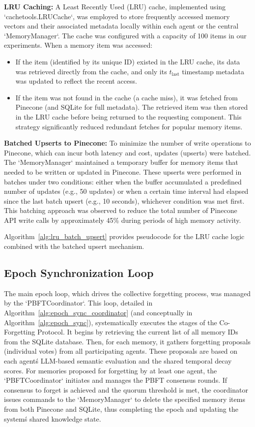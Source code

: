 \documentclass[conference]{IEEEtran}
\begin{document}
\textbf{LRU Caching:} A Least Recently Used (LRU) cache, implemented using `cachetools.LRUCache`, was employed to store frequently accessed memory vectors and their associated metadata locally within each agent or the central `MemoryManager`. The cache was configured with a capacity of 100 items in our experiments. When a memory item was accessed:
\begin{itemize}
    \item If the item (identified by its unique ID) existed in the LRU cache, its data was retrieved directly from the cache, and only its $t_{\text{last}}$ timestamp metadata was updated to reflect the recent access.
    \item If the item was not found in the cache (a cache miss), it was fetched from Pinecone (and SQLite for full metadata). The retrieved item was then stored in the LRU cache before being returned to the requesting component. This strategy significantly reduced redundant fetches for popular memory items.
\end{itemize}

\textbf{Batched Upserts to Pinecone:} To minimize the number of write operations to Pinecone, which can incur both latency and cost, updates (upserts) were batched. The `MemoryManager` maintained a temporary buffer for memory items that needed to be written or updated in Pinecone. These upserts were performed in batches under two conditions: either when the buffer accumulated a predefined number of updates (e.g., 50 updates) or when a certain time interval had elapsed since the last batch upsert (e.g., 10 seconds), whichever condition was met first. This batching approach was observed to reduce the total number of Pinecone API write calls by approximately 45\% during periods of high memory activity.

Algorithm~\ref{alg:lru_batch_upsert} provides pseudocode for the LRU cache logic combined with the batched upsert mechanism.

\subsection{Epoch Synchronization Loop}

The main epoch loop, which drives the collective forgetting process, was managed by the `PBFTCoordinator`. This loop, detailed in Algorithm~\ref{alg:epoch_sync_coordinator} (and conceptually in Algorithm~\ref{alg:epoch_sync}), systematically executes the stages of the Co-Forgetting Protocol. It begins by retrieving the current list of all memory IDs from the SQLite database. Then, for each memory, it gathers forgetting proposals (individual votes) from all participating agents. These proposals are based on each agent\'s LLM-based semantic evaluation and the shared temporal decay scores. For memories proposed for forgetting by at least one agent, the `PBFTCoordinator` initiates and manages the PBFT consensus rounds. If consensus to forget is achieved and the quorum threshold is met, the coordinator issues commands to the `MemoryManager` to delete the specified memory items from both Pinecone and SQLite, thus completing the epoch and updating the system\'s shared knowledge state.
\end{document}
